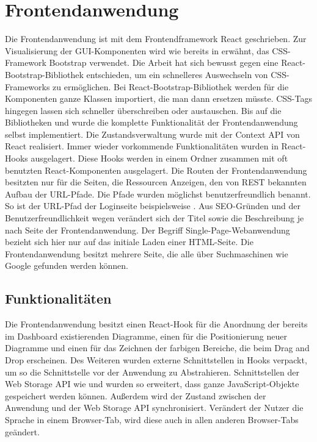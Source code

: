\section{Frontendanwendung}
\label{sec:frontendanwendung}
Die Frontendanwendung ist mit dem Frontendframework React geschrieben.
Zur Visualisierung der GUI-Komponenten wird wie bereits in 
erwähnt, das CSS-Framework Bootstrap verwendet. Die Arbeit hat sich bewusst gegen
eine React-Bootstrap-Bibliothek entschieden, um ein schnelleres Auswechseln von CSS-Frameworks
zu ermöglichen. Bei React-Bootstrap-Bibliothek werden für die Komponenten ganze Klassen importiert,
die man dann ersetzen müsste. CSS-Tags hingegen lassen sich schneller überschreiben oder austauschen.
Bis auf die Bibliotheken  und  wurde die komplette Funktionalität der Frontendanwendung
selbst implementiert. Die Zustandsverwaltung wurde mit der Context API von React realisiert.
Immer wieder vorkommende Funktionalitäten wurden in React-Hooks ausgelagert. Diese Hooks werden in einem
 Ordner zusammen mit oft benutzten React-Komponenten ausgelagert. Die Routen der Frontendanwendung
besitzten nur für die Seiten, die Ressourcen Anzeigen, den von REST bekannten Aufbau der URL-Pfade. Die Pfade
wurden möglichst benutzerfreundlich benannt. So ist der URL-Pfad der Loginseite beispielsweise .
Aus SEO-Gründen und der Benutzerfreundlichkeit wegen verändert sich der Titel sowie die Beschreibung je nach
Seite der Frontendanwendung. Der Begriff Single-Page-Webanwendung bezieht sich hier nur auf das initiale Laden
einer HTML-Seite. Die Frontendanwendung besitzt mehrere Seite, die alle über Suchmaschinen wie Google
gefunden werden können.

\subsection{Funktionalitäten}
\label{subsec:funktionalitaeten}
Die Frontendanwendung besitzt einen React-Hook für die Anordnung der bereits im Dashboard existierenden Diagramme, einen für
die Positionierung neuer Diagramme und einen für das Zeichnen der farbigen Bereiche, die beim Drag and Drop erscheinen.
Des Weiteren wurden externe Schnittstellen in Hooks verpackt, um so die Schnittstelle vor der Anwendung
zu Abstrahieren. Schnittstellen der Web Storage API wie  und 
wurden so erweitert, dass ganze JavaScript-Objekte gespeichert werden können. Außerdem wird der Zustand zwischen
der Anwendung und der Web Storage API synchronisiert. Verändert der Nutzer die Sprache in einem
Browser-Tab, wird diese auch in allen anderen Browser-Tabs geändert.

